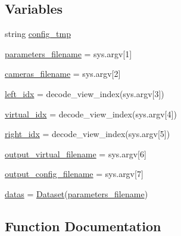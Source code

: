 \subsection*{Variables}
\begin{DoxyCompactItemize}
\item 
string \hyperlink{namespacemake__vsrs__config_a0688231eff3c27019463bd6ff56aacd9}{config\+\_\+tmp}
\item 
\hyperlink{namespacemake__vsrs__config_a8b581ca7889ba91fa3833ddd8350e531}{parameters\+\_\+filename} = sys.\+argv\mbox{[}1\mbox{]}
\item 
\hyperlink{namespacemake__vsrs__config_ac3b756bb1e7859c774b381148fd53d68}{cameras\+\_\+filename} = sys.\+argv\mbox{[}2\mbox{]}
\item 
\hyperlink{namespacemake__vsrs__config_aea06ffd15ffab67d1abe50d4e8c238a0}{left\+\_\+idx} = decode\+\_\+view\+\_\+index(sys.\+argv\mbox{[}3\mbox{]})
\item 
\hyperlink{namespacemake__vsrs__config_a942abb0bef473b35cee41ba20010380d}{virtual\+\_\+idx} = decode\+\_\+view\+\_\+index(sys.\+argv\mbox{[}4\mbox{]})
\item 
\hyperlink{namespacemake__vsrs__config_a31b0b1009f32743b1ffc27e78539235b}{right\+\_\+idx} = decode\+\_\+view\+\_\+index(sys.\+argv\mbox{[}5\mbox{]})
\item 
\hyperlink{namespacemake__vsrs__config_aa243e869e206ff385f9a78dfdf4e2455}{output\+\_\+virtual\+\_\+filename} = sys.\+argv\mbox{[}6\mbox{]}
\item 
\hyperlink{namespacemake__vsrs__config_a10d226e35ee3d383ddb4e32445182d57}{output\+\_\+config\+\_\+filename} = sys.\+argv\mbox{[}7\mbox{]}
\item 
\hyperlink{namespacemake__vsrs__config_aa31562adcb22457c1a02e578e04b07b7}{datas} = \hyperlink{classpylib_1_1dataset_1_1Dataset}{Dataset}(\hyperlink{namespacemake__vsrs__config_a8b581ca7889ba91fa3833ddd8350e531}{parameters\+\_\+filename})
\end{DoxyCompactItemize}


\subsection{Function Documentation}
